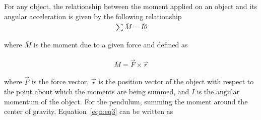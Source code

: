\documentclass{notes}
\begin{document}
 For any object, the relationship between the moment applied on an object and its angular acceleration is given by the following relationship
 \begin{align}
   \sum \overline{M} = I \ddot{\theta}\label{eqn:eq3}
 \end{align}
 
 where $\overline{M}$ is the moment due to a given force and defined as 
 
 \begin{align*}
   \overline{M} = \vec{F} \times \vec{r}
 \end{align*}
 
 where $\vec{F}$ is the force vector, $\vec{r}$ is the position vector of the object with respect to the point about which the moments are being summed, and $I$ is the angular momentum of the object. For the pendulum, summing the moment around the center of gravity, Equation~\ref{eqn:eq3} can be written as
\end{document}
